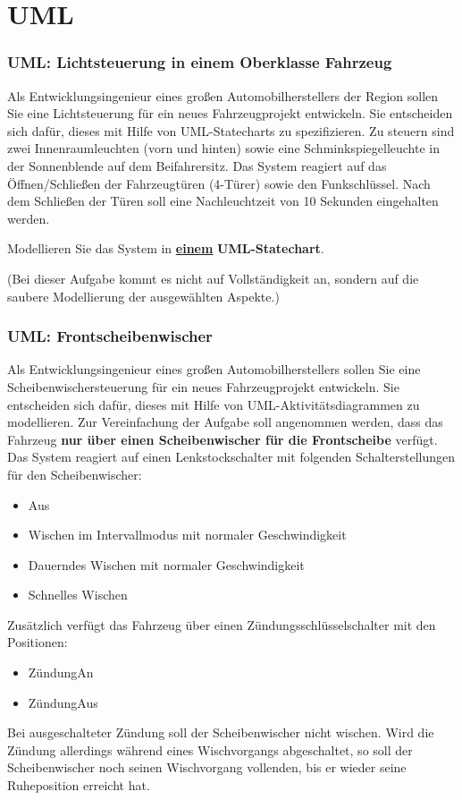 \part{UML}
\section{UML: Lichtsteuerung in einem Oberklasse Fahrzeug}
Als Entwicklungsingenieur eines großen Automobilherstellers der Region sollen Sie eine Lichtsteuerung für ein neues Fahrzeugprojekt entwickeln. Sie entscheiden sich dafür, dieses mit Hilfe von UML-Statecharts zu spezifizieren. Zu steuern sind zwei Innenraumleuchten (vorn und hinten) sowie eine Schminkspiegelleuchte in der Sonnenblende auf dem Beifahrersitz. Das System reagiert auf das Öffnen/Schließen der Fahrzeugtüren (4-Türer) sowie den Funkschlüssel. Nach dem Schließen der Türen soll eine Nachleuchtzeit von 10 Sekunden eingehalten werden.

Modellieren Sie das System in \underline{\textbf{einem}} \textbf{UML-Statechart}.

(Bei dieser Aufgabe kommt es nicht auf Vollständigkeit an, sondern auf die saubere Modellierung der ausgewählten Aspekte.)

\section{UML: Frontscheibenwischer}
Als Entwicklungsingenieur eines großen Automobilherstellers sollen Sie eine Scheibenwischersteuerung für ein neues Fahrzeugprojekt entwickeln. Sie entscheiden sich dafür, dieses mit Hilfe von UML-Aktivitätsdiagrammen zu modellieren. Zur Vereinfachung der Aufgabe soll angenommen werden, dass das Fahrzeug \textbf{nur über einen Scheibenwischer für die Frontscheibe} verfügt. Das System reagiert auf einen Lenkstockschalter mit folgenden Schalterstellungen für den Scheibenwischer:
\begin{itemize}
    \item Aus
    \item Wischen im Intervallmodus mit normaler Geschwindigkeit
    \item Dauerndes Wischen mit normaler Geschwindigkeit
    \item Schnelles Wischen
\end{itemize}
Zusätzlich verfügt das Fahrzeug über einen Zündungsschlüsselschalter mit den Positionen:
\begin{itemize}
    \item ZündungAn
    \item ZündungAus
\end{itemize}
Bei ausgeschalteter Zündung soll der Scheibenwischer nicht wischen. Wird die Zündung allerdings während eines Wischvorgangs abgeschaltet, so soll der Scheibenwischer noch seinen Wischvorgang vollenden, bis er wieder seine Ruheposition erreicht hat.

